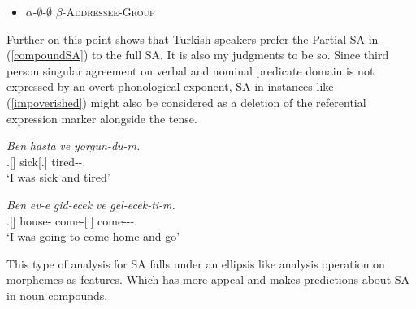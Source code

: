 \begin{itemize}
    \item $\alpha$-$\emptyset$-$\emptyset$ {\And} $\beta$-{\textsc{Addressee}-\textsc{Group}}
\end{itemize}

Further on this point \cite{kharytonava2012word} shows that Turkish speakers prefer the Partial SA in (\ref{compoundSA}) to the full SA. It is also my judgments to be so. Since third person singular agreement on verbal and nominal predicate domain is not expressed by an overt phonological exponent, SA in instances like (\ref{impoverished}) might also be considered as a deletion of the referential expression marker alongside the tense.

\begin{exe}
    \ex \label{impoverished}
    \begin{xlist}
        \ex \gll 
        \textit{Ben} \textit{hasta} \textit{ve} \textit{yorgun-du-m.} \\ {\First}.{\Sg}[{\Nom}] sick[{\Third}.{\Sg}] {\And} tired-{\Pst}-{\First}.{\Sg} \\
        \glt `I was sick and tired'
        
        \ex \gll
        \textit{Ben} \textit{ev-e} \textit{gid-ecek} \textit{ve} \textit{gel-ecek-ti-m.} \\ {\First}.{\Sg}[{\Nom}] house-{\Dat} come-{\Fut}[{\Third}.{\Sg}] {\And} come-{\Fut}-{\Pst}-{\First}.{\Sg} \\
        \glt `I was going to come home and go'
    \end{xlist}
\end{exe}

This type of analysis for SA falls under an ellipsis like analysis operation on morphemes as features. Which has more appeal and makes predictions about SA in noun compounds.